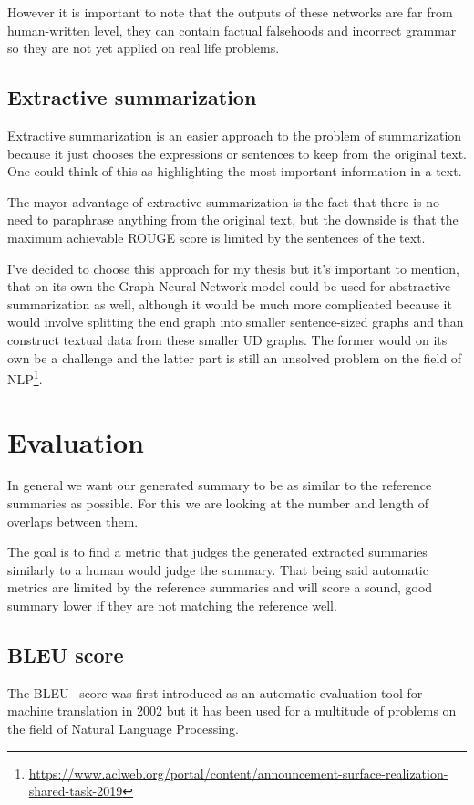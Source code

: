 However it is important to note that the outputs of these networks are far from human-written level, they can contain factual falsehoods and incorrect grammar so they are not yet applied on real life problems.

\subsection{Extractive summarization}
Extractive summarization is an easier approach to the problem of summarization because it just chooses the expressions or sentences to keep from the original text. One could think of this as highlighting the most important information in a text.

The mayor advantage of extractive summarization is the fact that there is no need to paraphrase anything from the original text, but the downside is that the maximum achievable ROUGE score is limited by the sentences of the text.

I've decided to choose this approach for my thesis but it's important to mention, that on its own the Graph Neural Network model could be used for abstractive summarization as well, although it would be much more complicated because it would involve splitting the end graph into smaller sentence-sized graphs and than construct textual data from these smaller UD graphs. The former would on its own be a challenge and the latter part is still an unsolved problem on the field of NLP\footnote{\url{https://www.aclweb.org/portal/content/announcement-surface-realization-shared-task-2019}}.

\section{Evaluation}
In general we want our generated summary to be as similar to the reference summaries as possible. For this we are looking at the number and length of overlaps between them.

The goal is to find a metric that judges the generated extracted summaries similarly to a human would judge the summary. That being said automatic metrics are limited by the reference summaries and will score a sound, good summary lower if they are not matching the reference well.

\subsection{BLEU score}
The BLEU~\cite{BLEU} score was first introduced as an automatic evaluation tool for machine translation in 2002 but it has been used for a multitude of problems on the field of Natural Language Processing.

